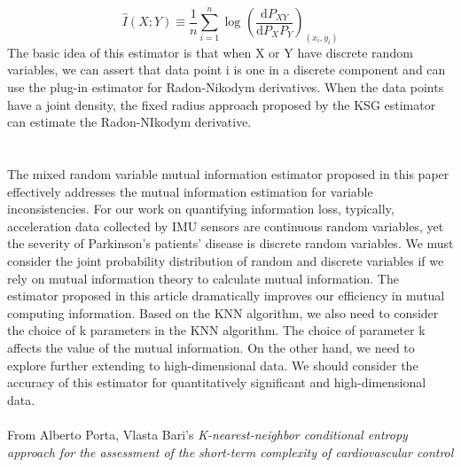 \begin{equation}
\hat{I} (X;Y) \equiv \frac{1}{n}   {\textstyle \sum_{i=1}^{n} \log_{}{(\frac{\mathrm{d}P_{XY}}{\mathrm{d}P_{X} P_{Y}})}_{(x_{i}, y_{i})}  }     
\end{equation}
The basic idea of this estimator is that when X or Y have discrete random variables, we can assert that data point i is one in a discrete component and can use the plug-in estimator for Radon-Nikodym derivatives. When the data points have a joint density, the fixed radius approach proposed by the KSG estimator can estimate the Radon-NIkodym derivative.\\
\\ \hspace*{\fill} \\
The mixed random variable mutual information estimator proposed in this paper effectively addresses the mutual information estimation for variable inconsistencies. For our work on quantifying information loss, typically, acceleration data collected by IMU sensors are continuous random variables, yet the severity of Parkinson's patients' disease is discrete random variables. We must consider the joint probability distribution of random and discrete variables if we rely on mutual information theory to calculate mutual information. The estimator proposed in this article dramatically improves our efficiency in mutual computing information. Based on the KNN algorithm, we also need to consider the choice of k parameters in the KNN algorithm. The choice of parameter k affects the value of the mutual information. On the other hand, we need to explore further extending to high-dimensional data. We should consider the accuracy of this estimator for quantitatively significant and high-dimensional data.
\\ \hspace*{\fill} \\

From Alberto Porta, Vlasta Bari's \emph{K-nearest-neighbor conditional entropy approach for the assessment of the short-term complexity of cardiovascular control} \cite{porta2012k}\\

